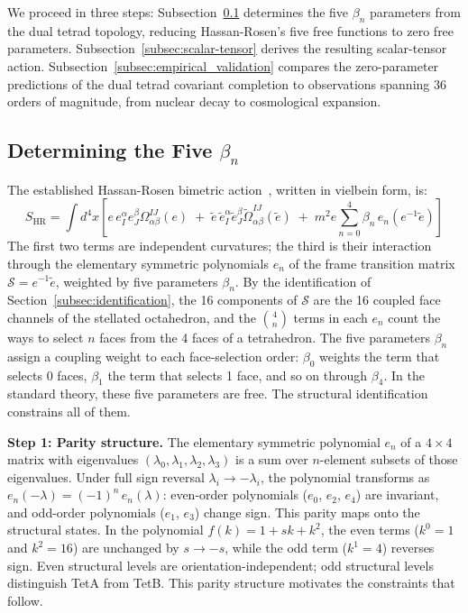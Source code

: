 \documentclass[aps,prd,preprint,superscriptaddress,showpacs,preprintnumbers,amsmath,amssymb,nofootinbib]{revtex4-2}
\begin{document}
We proceed in three steps: Subsection~\ref{subsec:beta} determines the five $\beta_n$ parameters from the dual tetrad topology, reducing Hassan-Rosen's five free functions to zero free parameters. Subsection~\ref{subsec:scalar-tensor} derives the resulting scalar-tensor action. Subsection~\ref{subsec:empirical_validation} compares the zero-parameter predictions of the dual tetrad covariant completion to observations spanning 36 orders of magnitude, from nuclear decay to cosmological expansion.

\subsection{Determining the Five $\beta_n$}
\label{subsec:beta}

The established Hassan-Rosen bimetric action~\cite{hassan2012}, written in vielbein form, is:
\begin{equation}
S_{\text{HR}} = \int d^4x \left[ e\, e_I^\alpha e_J^\beta \Omega^{IJ}_{\alpha\beta}(e) \;+\; \tilde{e}\, \tilde{e}_I^\alpha \tilde{e}_J^\beta \tilde{\Omega}^{IJ}_{\alpha\beta}(\tilde{e}) \;+\; m^2 e \sum_{n=0}^{4} \beta_n \, e_n(e^{-1}\tilde{e}) \right]
\label{eq:hassan-rosen}
\end{equation}
The first two terms are independent curvatures; the third is their interaction through the elementary symmetric polynomials $e_n$ of the frame transition matrix $\mathcal{S} = e^{-1}\tilde{e}$, weighted by five parameters $\beta_n$. By the identification of Section~\ref{subsec:identification}, the 16 components of $\mathcal{S}$ are the 16 coupled face channels of the stellated octahedron, and the $\binom{4}{n}$ terms in each $e_n$ count the ways to select $n$ faces from the 4 faces of a tetrahedron. The five parameters $\beta_n$ assign a coupling weight to each face-selection order: $\beta_0$ weights the term that selects 0 faces, $\beta_1$ the term that selects 1 face, and so on through $\beta_4$. In the standard theory, these five parameters are free. The structural identification constrains all of them.

\textbf{Step 1: Parity structure.} The elementary symmetric polynomial $e_n$ of a $4 \times 4$ matrix with eigenvalues $(\lambda_0, \lambda_1, \lambda_2, \lambda_3)$ is a sum over $n$-element subsets of those eigenvalues. Under full sign reversal $\lambda_i \to -\lambda_i$, the polynomial transforms as $e_n(-\lambda) = (-1)^n\,e_n(\lambda)$: even-order polynomials ($e_0$, $e_2$, $e_4$) are invariant, and odd-order polynomials ($e_1$, $e_3$) change sign. This parity maps onto the structural states. In the polynomial $f(k) = 1 + sk + k^2$, the even terms ($k^0 = 1$ and $k^2 = 16$) are unchanged by $s \to -s$, while the odd term ($k^1 = 4$) reverses sign. Even structural levels are orientation-independent; odd structural levels distinguish TetA from TetB. This parity structure motivates the constraints that follow.
\end{document}
